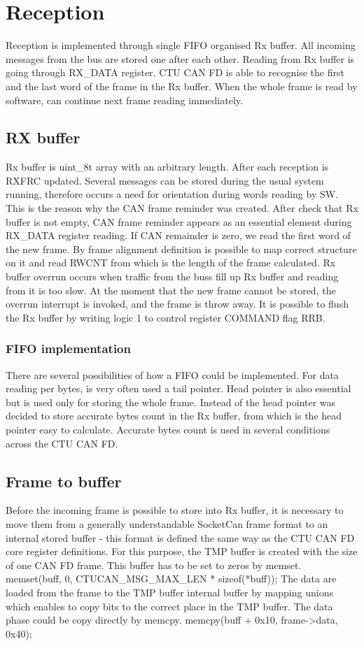 \documentclass{ctuthesis}
\begin{document}
 \section{Reception}
  Reception is implemented through single FIFO organised Rx buffer. All incoming messages from the bus are stored one after each other. Reading from Rx buffer is going through RX\_DATA register. CTU CAN FD is able to recognise the first and the last word of the frame in the Rx buffer. When the whole frame is read by software, can continue next frame reading immediately.

 \subsection{RX buffer}
  Rx buffer is uint\_8t array with an arbitrary length. After each reception is RXFRC updated. Several messages can be stored during the usual system running, therefore occurs a need for orientation during words reading by SW. This is the reason why the CAN frame reminder was created. After check that Rx buffer is not empty, CAN frame reminder appears as an essential element during RX\_DATA register reading. If CAN remainder is zero, we read the first word of the new frame. By frame alignment definition is possible to map correct structure on it and read RWCNT from which is the length of the frame calculated. Rx buffer overrun occurs when traffic from the buss fill up Rx buffer and reading from it is too slow. At the moment that the new frame cannot be stored, the overrun interrupt is invoked, and the frame is throw away. It is possible to flush the Rx buffer by writing logic 1 to control register COMMAND flag RRB. 
 
  \subsubsection{FIFO implementation}
   There are several possibilities of how a FIFO could be implemented. For data reading per bytes, is very often used a tail pointer. Head pointer is also essential but is used only for storing the whole frame. Instead of the head pointer was decided to store accurate bytes count in the Rx buffer, from which is the head pointer easy to calculate. Accurate bytes count is used in several conditions across the CTU CAN FD.
 
 \subsection{Frame to buffer}
  Before the incoming frame is possible to store into Rx buffer, it is necessary to move them from a generally understandable SocketCan frame format to an internal stored buffer - this format is defined the same way as the CTU CAN FD core register definitions. For this purpose, the TMP buffer is created with the size of one CAN FD frame. This buffer has to be set to zeros by memset.
  memset(buff, 0, CTUCAN\_MSG\_MAX\_LEN * sizeof(*buff));
  The data are loaded from the frame to the TMP buffer internal buffer by mapping unions which enables to copy bits to the correct place in the TMP buffer. The data phase could be copy directly by memcpy.
memcpy(buff + 0x10, frame->data, 0x40);
 
\end{document}
